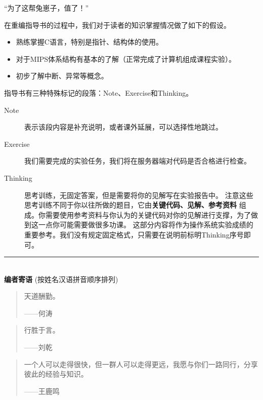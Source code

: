 \vspace*{0.5\baselineskip}

“为了这帮兔崽子，值了！”

在重编指导书的过程中，我们对于读者的知识掌握情况做了如下的假设。

\begin{itemize}
  \item 熟练掌握C语言，特别是指针、结构体的使用。
  \item 对于MIPS体系结构有基本的了解（正常完成了计算机组成课程实验）。
  \item 初步了解中断、异常等概念。
\end{itemize}

指导书有三种特殊标记的段落：Note、Exercise和Thinking。
\begin{description}
\item[Note] 表示该段内容是补充说明，或者课外延展，可以选择性地跳过。
\item[Exercise] 我们需要完成的实验任务，我们将在服务器端对代码是否合格进行检查。
\item[Thinking] 思考训练，无固定答案，但是需要将你的见解写在实验报告中。
注意这些思考训练不同于你以往所做的题目，它由\textbf{关键代码、见解、参考资料}
组成。你需要使用参考资料与你认为的关键代码对你的见解进行支撑，为了做到这一点你可能需要做很多功课。
这部分内容将作为操作系统实验成绩的重要参考。我们没有规定固定格式，只需要在说明前标明Thinking序号即可。
\end{description}


\begingroup
\vspace*{\baselineskip}

\noindent\centering\rule{0.9\textwidth}{0.2pt}\\[\baselineskip]

\noindent\LARGE \textbf{编者寄语} \small (按姓名汉语拼音顺序排列)

\begin{quotation}
  天道酬勤。
  \begin{flushright}
  ——何涛
  \end{flushright}
\end{quotation}

\begin{quotation}
行胜于言。
  \begin{flushright}
  ——刘乾
  \end{flushright}
\end{quotation}

\begin{quotation}
  一个人可以走得很快，但一群人可以走得更远，我愿与你们一路同行，分享彼此的经验与知识。
  \begin{flushright}
  ——王鹿鸣
  \end{flushright}
\end{quotation}

\endgroup

